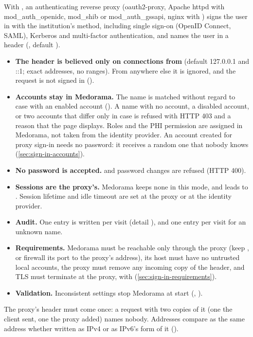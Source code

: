 With , an authenticating reverse proxy (oauth2-proxy, Apache httpd with
mod\_auth\_openidc, mod\_shib or mod\_auth\_gssapi, nginx with ) signs the
user in with the institution's method, including single sign-on (OpenID Connect, SAML), Kerberos
and multi-factor authentication, and names the user in a header (,
default ).
\begin{itemize}
\item \textbf{The header is believed only on connections from } (default
  127.0.0.1 and ::1; exact addresses, no ranges). From anywhere else it is ignored, and the
  request is not signed in ().
\item \textbf{Accounts stay in Medorama.} The name is matched without regard to case with an
  enabled account (). A name with no account, a disabled account, or
  two accounts that differ only in case is refused with HTTP 403 and a reason that the page
  displays. Roles and the PHI permission are assigned in Medorama, not taken from the identity
  provider. An account created for proxy sign-in needs no password: it receives a random one that
  nobody knows (\cref{sec:sign-in-accounts}).
\item \textbf{No password is accepted.}  and password changes are refused (HTTP
  400).
\item \textbf{Sessions are the proxy's.} Medorama keeps none in this mode, and 
  leads to . Session lifetime and idle timeout are set at the proxy or
  at the identity provider.
\item \textbf{Audit.} One  entry is written per visit (detail ), and one
   entry per visit for an unknown name.
\item \textbf{Requirements.} Medorama must be reachable only through the proxy (keep
  , or firewall its port to the proxy's address), its host must have no
  untrusted local accounts, the proxy must remove any incoming copy of the header, and TLS must
  terminate at the proxy, with  (\cref{sec:sign-in-requirements}).
\item \textbf{Validation.} Inconsistent settings stop Medorama at start (,
  ).
\end{itemize}
The proxy's header must come once: a request with two copies of it (one the client sent, one the
proxy added) names nobody. Addresses compare as the same address whether written as IPv4 or as
IPv6's form of it ().

